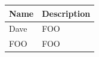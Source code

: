 \begin{longtable}[]{@{}ll@{}}
\toprule\noalign{}
Name & Description \\
\midrule\noalign{}
\endhead
\bottomrule\noalign{}
\endlastfoot
Dave & \gls{FOO} \\
\gls{FOO} & \Gls{FOO} \\
\end{longtable}
